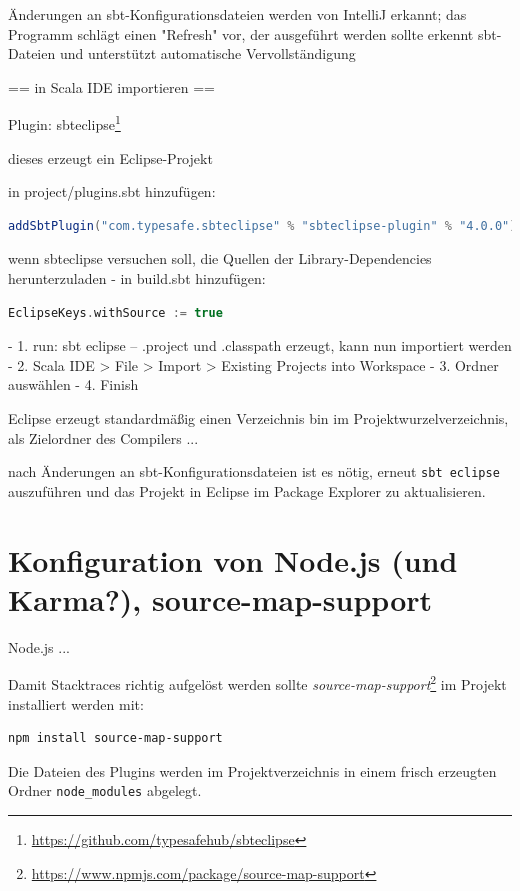 \documentclass[a4paper, 12pt, listof=totoc, bibliography=totoc]{scrreprt}
\begin{document}
Änderungen an sbt-Konfigurationsdateien werden von IntelliJ erkannt; das Programm schlägt einen "Refresh" vor, der ausgeführt werden sollte
erkennt sbt-Dateien und unterstützt automatische Vervollständigung


== in Scala IDE importieren ==

Plugin: sbteclipse\footnote{\url{https://github.com/typesafehub/sbteclipse}}

dieses erzeugt ein Eclipse-Projekt

in project/plugins.sbt hinzufügen:
\begin{lstlisting}[language=Scala]
addSbtPlugin("com.typesafe.sbteclipse" % "sbteclipse-plugin" % "4.0.0")
\end{lstlisting}

wenn sbteclipse versuchen soll, die Quellen der Library-Dependencies herunterzuladen - in build.sbt hinzufügen:

\begin{lstlisting}[language=Scala]
EclipseKeys.withSource := true
\end{lstlisting}



- 1. run:
  sbt eclipse  --  .project und .classpath erzeugt, kann nun importiert werden
- 2. Scala IDE > File > Import > Existing Projects into Workspace
- 3. Ordner auswählen
- 4. Finish


Eclipse erzeugt standardmäßig einen Verzeichnis bin im Projektwurzelverzeichnis, als Zielordner des Compilers ...

nach Änderungen an sbt-Konfigurationsdateien ist es nötig, erneut \texttt{sbt eclipse} auszuführen und das Projekt in Eclipse im Package Explorer zu aktualisieren.


\section{Konfiguration von Node.js (und Karma?), source-map-support}

Node.js ...

Damit Stacktraces richtig aufgelöst werden sollte \textit{source-map-support}\footnote{\url{https://www.npmjs.com/package/source-map-support}} im Projekt installiert werden mit:

\begin{lstlisting}
npm install source-map-support
\end{lstlisting}

Die Dateien des Plugins werden im Projektverzeichnis in einem frisch erzeugten Ordner \texttt{node\_modules} abgelegt.
\end{document}
